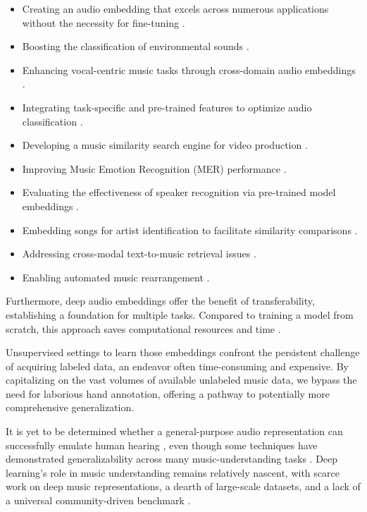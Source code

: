 \begin{itemize}
\item Creating an audio embedding that excels across numerous applications without the necessity for fine-tuning \cite{Turian2022HEAR:Representations}.
\item Boosting the classification of environmental sounds \cite{CramerLOOKEMBEDDINGS}.
\item Enhancing vocal-centric music tasks through cross-domain audio embeddings \cite{Kim2021LearningLoss}.
\item Integrating task-specific and pre-trained features to optimize audio classification \cite{Hung2022Feature-informedClassification}.
\item Developing a music similarity search engine for video production \cite{epidemic}.
\item Improving Music Emotion Recognition (MER) performance \cite{KohComparisonRecognition}.
\item Evaluating the effectiveness of speaker recognition via pre-trained model embeddings \cite{lightweight}.
\item Embedding songs for artist identification to facilitate similarity comparisons \cite{contentmusicsimtriplet2020}.
\item Addressing cross-modal text-to-music retrieval issues \cite{WonEmotionStories}.
\item Enabling automated music rearrangement \cite{Stoller2018IntuitiveTransitions, Plachouras2023MusicSegmentation}.
\end{itemize}



Furthermore, deep audio embeddings offer the benefit of transferability, establishing a foundation for multiple tasks. Compared to training a model from scratch, this approach saves computational resources and time \cite{transferMIR2013, CifkaDeepTransfer, Ding2023AudioClassification}.

Unsupervised settings to learn those embeddings confront the persistent challenge of acquiring labeled data, an endeavor often time-consuming and expensive. By capitalizing on the vast volumes of available unlabeled music data, we bypass the need for laborious hand annotation, offering a pathway to potentially more comprehensive generalization.

It is yet to be determined whether a general-purpose audio representation can successfully emulate human hearing \cite{Turian2022HEAR:Representations}, even though some techniques have demonstrated generalizability across many music-understanding tasks \cite{Li2023MERT:Training, Kim2020OneStrategies}. Deep learning's role in music understanding remains relatively nascent, with scarce work on deep music representations, a dearth of large-scale datasets, and a lack of a universal community-driven benchmark \cite{Turian2022HEAR:Representations, Yuan2023MARBLE:Evaluation}.

